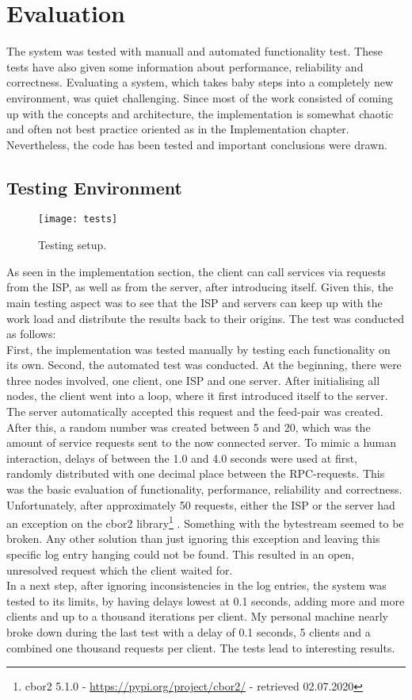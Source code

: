 \chapter{Evaluation}
The system was tested with manuall and automated functionality test. These tests have also given some information about performance, reliability and correctness. Evaluating a system, which takes baby steps into a completely new environment, was quiet challenging. Since most of the work consisted of coming up with the concepts and architecture, the implementation is somewhat chaotic and often not best practice oriented as in the Implementation chapter. Nevertheless, the code has been tested and important conclusions were drawn.
\section{Testing Environment}
\begin{figure}
    \centering
    \texttt{[image: tests]}
    \caption{Testing setup.}
    \label{fig:tests}
\end{figure}
As seen in the implementation section, the client can call services via requests from the ISP, as well as from the server, after introducing itself. Given this, the main testing aspect was to see that the ISP and servers can keep up with the work load and distribute the results back to their origins. The test was conducted as follows:\\
First, the implementation was tested manually by testing each functionality on its own. Second, the automated test was conducted. At the beginning, there were three nodes involved, one client, one ISP and one server. After initialising all nodes, the client went into a loop, where it first introduced itself to the server. The server automatically accepted this request and the feed-pair was created. After this, a random number was created between 5 and 20, which was the amount of service requests sent to the now connected server. To mimic a human interaction, delays of between the 1.0 and 4.0 seconds were used at first, randomly distributed with one decimal place between the RPC-requests. This was the basic evaluation of functionality, performance, reliability and correctness.\\
Unfortunately, after approximately 50 requests, either the ISP or the server had an exception on the cbor2 library\footnote{cbor2 5.1.0 - \url{https://pypi.org/project/cbor2/} - retrieved 02.07.2020} . Something with the bytestream seemed to be broken. Any other solution than just ignoring this exception and leaving this specific log entry hanging could not be found. This resulted in an open, unresolved request which the client waited for. \\
In a next step, after ignoring inconsistencies in the log entries, the system was tested to its limits, by having delays lowest at 0.1 seconds, adding more and more clients and up to a thousand iterations per client. My personal machine nearly broke down during the last test with a delay of 0.1 seconds, 5 clients and a combined one thousand requests per client. The tests lead to interesting results.

